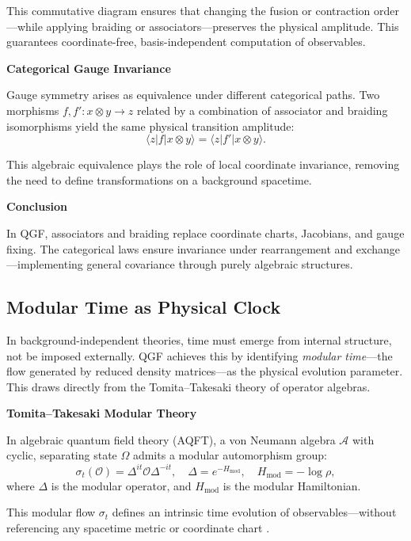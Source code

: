 \documentclass[11pt]{article}
\begin{document}
This commutative diagram ensures that changing the fusion or contraction order—while applying braiding or associators—preserves the physical amplitude. This guarantees coordinate-free, basis-independent computation of observables.

\vspace{0.5em}
\noindent\textbf{Categorical Gauge Invariance}

Gauge symmetry arises as equivalence under different categorical paths. Two morphisms \( f, f': x \otimes y \rightarrow z \) related by a combination of associator and braiding isomorphisms yield the same physical transition amplitude:
\[
\langle z | f | x \otimes y \rangle = \langle z | f' | x \otimes y \rangle.
\]

This algebraic equivalence plays the role of local coordinate invariance, removing the need to define transformations on a background spacetime.

\vspace{0.5em}
\noindent\textbf{Conclusion}

In QGF, associators and braiding replace coordinate charts, Jacobians, and gauge fixing. The categorical laws ensure invariance under rearrangement and exchange—implementing general covariance through purely algebraic structures.



\subsection{Modular Time as Physical Clock}

In background-independent theories, time must emerge from internal structure, not be imposed externally. QGF achieves this by identifying \emph{modular time}—the flow generated by reduced density matrices—as the physical evolution parameter. This draws directly from the Tomita–Takesaki theory of operator algebras.

\vspace{0.5em}
\noindent\textbf{Tomita–Takesaki Modular Theory}

In algebraic quantum field theory (AQFT), a von Neumann algebra \( \mathcal{A} \) with cyclic, separating state \( \Omega \) admits a modular automorphism group:
\[
\sigma_t(\mathcal{O}) = \Delta^{it} \mathcal{O} \Delta^{-it}, \quad \Delta = e^{-H_{\text{mod}}}, \quad H_{\text{mod}} = -\log \rho,
\]
where \( \Delta \) is the modular operator, and \( H_{\text{mod}} \) is the modular Hamiltonian.

This modular flow \( \sigma_t \) defines an intrinsic time evolution of observables—without referencing any spacetime metric or coordinate chart \cite{Takesaki1970, Bisognano1976}.
\end{document}
